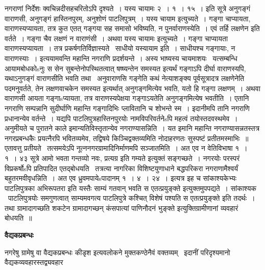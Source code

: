 \documentclass[11pt, openany]{book}
\begin{document}
नगराणां निर्देशः क्वचिन्नदीसहचरितोऽपि दृश्यते~। यस्य चायामः २~। १~। १५~। इति सूत्रे अनुगङ्गं वाराणसी, अनुगङ्गं हास्तिनपुरम्, अनुशोणं पाटलिपुत्रम्~। यस्य चायाम इत्युच्यते~। गङ्गा चाप्यायता, वाराणस्यप्यायता, तत्र कुत एतत् गङ्गया सह समासो भविष्यति, न पुनर्वाराणस्येति~। एवं तर्हि लक्षणेन इति वर्तते~। गङ्गा चैव लक्षणं न वाराणंसी~। अथवा {\qt यस्य चायामः} इत्युच्यते~। गङ्गा चाप्यायता वाराणस्यप्यायता~। तत्र प्रकर्षगतिर्विज्ञास्यते \textendash\ साधीयो यस्यायाम इति~। साधीयश्च गङ्गायाः, न वाराणस्याः~। इत्ययामवन्ति महान्ति नगराणि प्रदर्शयन्ते~। अस्य भाष्यस्य चायमाशयः \textendash\ यत्सम्बन्धि आयामबोधकोsनुः स सेन सुबन्तेनोपस्थितत्वात् षष्ष्यन्तेन समस्यत इत्यर्थं गङ्गाऽपि दीर्घा वाराणस्यपि, यथाऽनुगङ्गं वाराणसीति भवति तथा \textendash\ अनुवाराणसि गङ्गेति कथं नेत्याशङ्क्य पूर्वसूत्रादत्र लक्षणेनेति पदमनुवर्तते, तेन लक्षणवाचकेन समस्यत इत्यर्थात् अनुगङ्गमित्येव भवति, यतो हि गङ्गा लक्षणम्~। अथवा वाराणसी आयता गङ्गाsप्यायता, तत्र वाराणस्यपेक्षया गङ्गाऽयतेति अनुगङ्गमित्येष भवतीति~। एतानि नगराणि सम्पन्नानि सुदीर्घाणि महान्ति गङ्गादिभिः प्लावितानि च शोभन्ते स्म~। इदानीमपि तानि नगराणि प्रधानान्येव वर्तन्ते~। यद्यपि पाटलिपुत्रहास्तिनपुरयोः नामविपरिवर्तनेsपि महत्वं तयोस्तदवस्थमेव~। अनुमीयते च पुरातने काले इमान्यतिविस्तृतान्येव नगराण्यासन्निति~। यत इमानि महान्ति नगराण्यासन्नतस्तत्र नगरप्रबन्धकैः प्रयत्नैरपि भवितव्यमेव, तद्विषये किञ्चिद्वक्तव्यमिति नोदाहरणतः सुस्पष्टं प्रतीतमस्माभिः~॥\\

एतावत्तु प्रतीयते \textendash\ तत्समयेऽपि नूत्ननगरग्रामादिनिर्माणमपि सञ्जातमिति~। अत एव न वेतिविभाषा १~। १~। ४३ सूत्रे {\qt आमो भवता गन्तव्यो नवः, प्रत्यग्र इति गम्यते} इत्युक्तं सङ्गच्छते~। नगरयोः परस्परं विप्रकर्षोsपि प्रतिपादित एतद्बोधयति \textendash\ तत्रत्या नागरिका विशिष्टयुणाधाने बद्धपरिकरा नगराणामैश्वर्यं बहुतरमवीवृधन्निति~। अत एव ध्रुवमपायेsपादानम् १~। ४~। २४~। इत्यत्र इह च सांकाश्यकेभ्यः पाटलिपुत्रका अभिरूपतरा इति यस्तैः साम्यं गतवान् भवति स एतत्प्रयुङ्क्ते इत्युक्तमुपपद्यते~। सांकाश्यक \textendash\ पाटलिपुत्रयोः समगुणत्वात् साम्यमवगत्य पाटलिपुत्रे कश्चित् विशेषं पश्यति स एतत्प्रयुङ्क्ते इति तदर्थः~। तथा {\qt ग्रामादागच्छति शकटेन} ग्रामादागच्छन् कंसपात्यां पाणिनौदनं भुङ्क्ते इत्युक्तिग्रामीणानां व्यवहारं बोधयति~॥

\begin{center}
\textbf{\Large वैद्यकप्रबन्धः \textendash\ }
\end{center}

नगरेषु ग्रामेषु वा वैद्यकप्रबन्धः कीडृश इत्यवलोकने मुक्तकण्ठेनैवं वक्तव्यम् \textendash\ इदानीं परिदृश्यमानो वैद्यकव्यवहारस्तद्व्यवहार \textendash\
\end{document}
